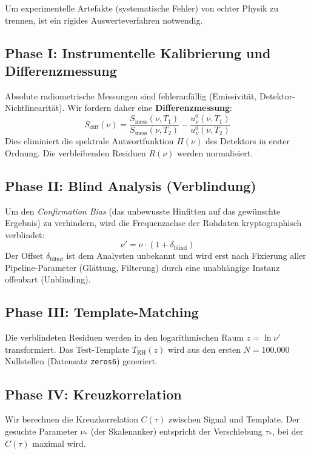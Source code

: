 \documentclass[11pt, a4paper]{article}
\begin{document}
	Um experimentelle Artefakte (systematische Fehler) von echter Physik zu trennen, ist ein rigides Auswerteverfahren notwendig.
	
	\subsection{Phase I: Instrumentelle Kalibrierung und Differenzmessung}
	
	Absolute radiometrische Messungen sind fehleranfällig (Emissivität, Detektor-Nichtlinearität). Wir fordern daher eine \textbf{Differenzmessung}:
	\begin{equation}
		S_{\text{diff}}(\nu) = \frac{S_{\text{mess}}(\nu, T_1)}{S_{\text{mess}}(\nu, T_2)} - \frac{u_\nu^0(\nu, T_1)}{u_\nu^0(\nu, T_2)}
	\end{equation}
	Dies eliminiert die spektrale Antwortfunktion $H(\nu)$ des Detektors in erster Ordnung. Die verbleibenden Residuen $R(\nu)$ werden normalisiert.
	
	\subsection{Phase II: Blind Analysis (Verblindung)}
	Um den \textit{Confirmation Bias} (das unbewusste \glqq Hinfitten\grqq{} auf das gewünschte Ergebnis) zu verhindern, wird die Frequenzachse der Rohdaten kryptographisch verblindet:
	\begin{equation}
		\nu' = \nu \cdot (1 + \delta_{\text{blind}})
	\end{equation}
	Der Offset $\delta_{\text{blind}}$ ist dem Analysten unbekannt und wird erst nach Fixierung aller Pipeline-Parameter (Glättung, Filterung) durch eine unabhängige Instanz offenbart (\glqq Unblinding\grqq).
	
	\subsection{Phase III: Template-Matching}
	Die verblindeten Residuen werden in den logarithmischen Raum $z = \ln \nu'$ transformiert. Das Test-Template $T_{\text{RH}}(z)$ wird aus den ersten $N=100.000$ Nullstellen (Datensatz \texttt{zeros6}) generiert.
	
	\subsection{Phase IV: Kreuzkorrelation}
	Wir berechnen die Kreuzkorrelation $C(\tau)$ zwischen Signal und Template. Der gesuchte Parameter $\nu_*$ (der Skalenanker) entspricht der Verschiebung $\tau_*$, bei der $C(\tau)$ maximal wird.
	
\end{document}
